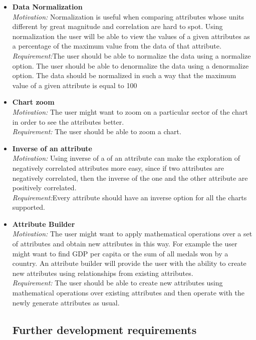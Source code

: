 \documentclass[a4paper]{article}
\begin{document}
\begin{itemize}
\item[\checkmark]{\textbf{Data Normalization}
\\\textit{Motivation:} Normalization is useful when comparing attributes whose units different by great magnitude and correlation are hard to spot. Using normalization the user will be able to view the values of a given attributes as a percentage of the maximum value from the data of that attribute.
\\\textit{Requirement:}The user should be able to normalize the data using a normalize option. The user should be able to denormalize the data using a denormalize option. The data should be normalized in such a way that the maximum value of a given attribute is equal to 100%
}

\item[\checkmark]{\textbf{Chart zoom}
\\\textit{Motivation:} The user might want to zoom on a particular sector of the chart in order to see the attributes better.
\\\textit{Requirement:} The user should be able to zoom a chart.
}

\item[\checkmark]{\textbf{Inverse of an attribute}
\\\textit{Motivation:} Using inverse of a of an attribute can make the exploration of negatively correlated attributes more easy, since if two attributes are negatively correlated, then the inverse of the one and the other attribute are positively correlated.
\\\textit{Requirement:}Every attribute should have an inverse option for all the charts supported.
}

\item[\checkmark]{\textbf{Attribute Builder}
\\\textit{Motivation:} The user might want to apply mathematical operations over a set of attributes and obtain new attributes in this way. For example the user might want to find GDP per capita or the sum of all medals won by a country. An attribute builder will provide the user with the ability to create new attributes using relationships from existing attributes.
\\\textit{Requirement:} The user should be able to create new attributes using mathematical operations over existing attributes and then operate with the newly generate attributes as usual.
}


\subsection{Further development requirements}


\end{itemize}
\end{document}
